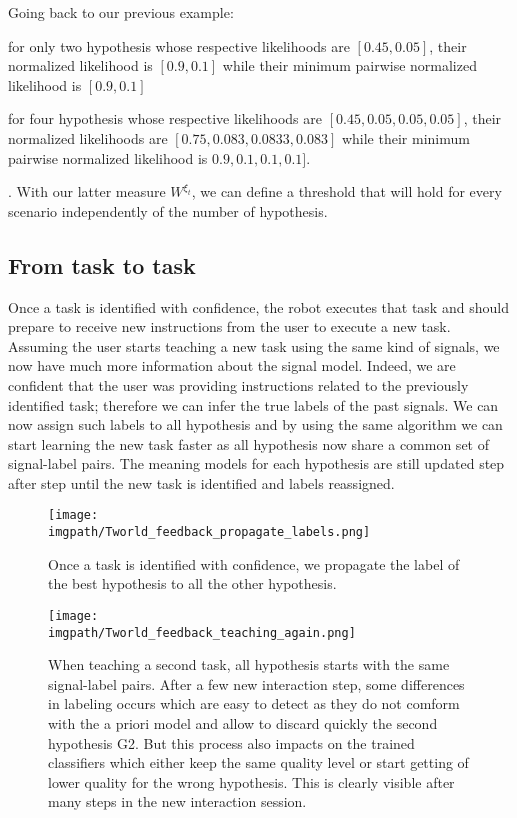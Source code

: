 Going back to our previous example: \begin{inparaenum}[a)] \item for only two hypothesis whose respective likelihoods are $[0.45, 0.05]$, their normalized likelihood is $[0.9,0.1]$ while their minimum pairwise normalized likelihood is $[0.9, 0.1]$ \item for four hypothesis whose respective likelihoods are $[0.45, 0.05, 0.05, 0.05]$, their normalized likelihoods are $[0.75, 0.083, 0.0833, 0.083]$ while their minimum pairwise normalized likelihood is $0.9, 0.1, 0.1, 0.1]$. \end{inparaenum}. With our latter measure $W^{\xi_t}$, we can define a threshold that will hold for every scenario independently of the number of hypothesis. 

\subsection{From task to task}
\label{chapter:lfui:tasttotask}

Once a task is identified with confidence, the robot executes that task and should prepare to receive new instructions from the user to execute a new task. Assuming the user starts teaching a new task using the same kind of signals, we now have much more information about the signal model. Indeed, we are confident that the user was providing instructions related to the previously identified task; therefore we can infer the true labels of the past signals. We can now  assign such labels to all hypothesis and by using the same algorithm we can start learning the new task faster as all hypothesis now share a common set of signal-label pairs. The meaning models for each hypothesis are still updated step after step until the new task is identified and labels reassigned.


\begin{figure}[!ht]
  \centering
  \texttt{[image: \\imgpath/Tworld\_feedback\_propagate\_labels.png]}
  \caption{Once a task is identified with confidence, we propagate the label of the best hypothesis to all the other hypothesis.}
  \label{fig:TworldPropagate}
\end{figure}


\begin{figure}[!ht]
  \centering
  \texttt{[image: \\imgpath/Tworld\_feedback\_teaching\_again.png]}
  \caption{When teaching a second task, all hypothesis starts with the same signal-label pairs. After a few new interaction step, some differences in labeling occurs which are easy to detect as they do not comform with the a priori model and allow to discard quickly the second hypothesis G2. But this process also impacts on the trained classifiers which either keep the same quality level or start getting of lower quality for the wrong hypothesis. This is clearly visible after many steps in the new interaction session.}
  \label{fig:TworldReuse}
\end{figure}

